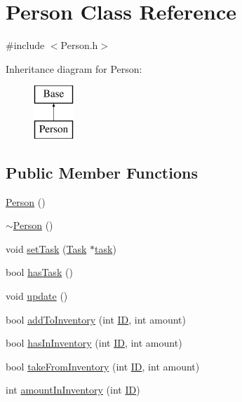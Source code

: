 \hypertarget{classPerson}{\section{Person Class Reference}
\label{classPerson}
}


{\ttfamily \#include $<$Person.\-h$>$}

Inheritance diagram for Person\-:\begin{figure}[H]
\begin{center}
\leavevmode
\includegraphics[height=2.000000cm]{classPerson}
\end{center}
\end{figure}
\subsection*{Public Member Functions}
\begin{DoxyCompactItemize}
\item 
\hyperlink{classPerson_a0397c6f89fafc12e738923f612bc41a3}{Person} ()
\item 
\hyperlink{classPerson_a700ffd693321c5fe6880262acf43d4da}{$\sim$\-Person} ()
\item 
void \hyperlink{classPerson_ae88c0a708c6a5c58fd76b305255c584e}{set\-Task} (\hyperlink{classTask}{Task} $\ast$\hyperlink{classPerson_a944dd7acfce7fb981e4c315f94b08ad9}{task})
\item 
bool \hyperlink{classPerson_a74924761363e651fbcde4aa0efb248f6}{has\-Task} ()
\item 
void \hyperlink{classPerson_ab895684028fe0d6a7bc23aec98ef8b0c}{update} ()
\item 
bool \hyperlink{classPerson_a0ce447d0c011c1060e9d5909f7621221}{add\-To\-Inventory} (int \hyperlink{classBase_a1dddc037afe2eae3e1364597e6a3cf46}{I\-D}, int amount)
\item 
bool \hyperlink{classPerson_ad266dba5486c59b07826bc2a78a2bc3e}{has\-In\-Inventory} (int \hyperlink{classBase_a1dddc037afe2eae3e1364597e6a3cf46}{I\-D}, int amount)
\item 
bool \hyperlink{classPerson_a7767ab0d8b5cdfc9cc69ce7739bf7be1}{take\-From\-Inventory} (int \hyperlink{classBase_a1dddc037afe2eae3e1364597e6a3cf46}{I\-D}, int amount)
\item 
int \hyperlink{classPerson_a9e7ac8aed6fa10fc1bba46e55779d7eb}{amount\-In\-Inventory} (int \hyperlink{classBase_a1dddc037afe2eae3e1364597e6a3cf46}{I\-D})
\end{DoxyCompactItemize}
